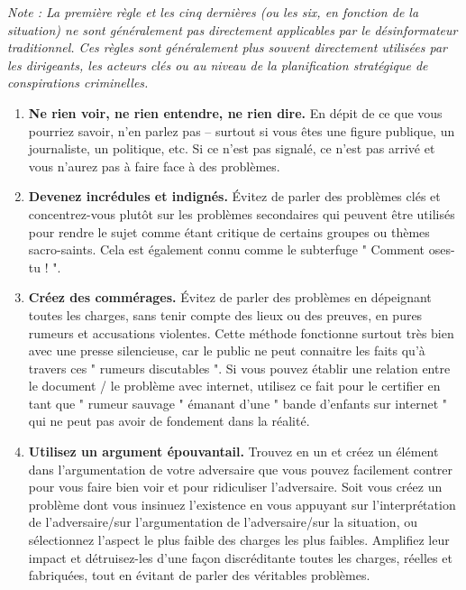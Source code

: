 \documentclass[11pt,twoside,a4paper]{article}
\begin{document}
\emph{Note : La premi{\`e}re r{\`e}gle et les cinq derni{\`e}res (ou les six, en fonction de la situation) ne sont g{\'e}n{\'e}ralement pas directement applicables par le d{\'e}sinformateur traditionnel. Ces r{\`e}gles sont g{\'e}n{\'e}ralement plus souvent directement utilis{\'e}es par les dirigeants, les acteurs cl{\'e}s ou au niveau de la planification strat{\'e}gique de conspirations criminelles.}~\\
\setlength\parindent{20pt}
\begin{enumerate}
	\item \textbf{Ne rien voir, ne rien entendre, ne rien dire. } En d{\'e}pit de ce que vous pourriez savoir, n'en parlez pas -- surtout si vous {\^e}tes une figure publique, un journaliste, un politique, etc. Si ce n'est pas signal{\'e}, ce n'est pas arriv{\'e} et vous n'aurez pas {\`a} faire face {\`a} des probl{\`e}mes.
	\item \textbf{Devenez incr{\'e}dules et indign{\'e}s. } {\'E}vitez de parler des probl{\`e}mes cl{\'e}s et concentrez-vous plut{\^o}t sur les probl{\`e}mes secondaires qui peuvent {\^e}tre utilis{\'e}s pour rendre le sujet comme {\'e}tant critique de certains groupes ou th{\`e}mes sacro-saints. Cela est {\'e}galement connu comme le subterfuge " Comment oses-tu ! ".
	\item \textbf{Cr{\'e}ez des comm{\'e}rages. } {\'E}vitez de parler des probl{\`e}mes en d{\'e}peignant toutes les charges, sans tenir compte des lieux ou des preuves, en pures rumeurs et accusations violentes. Cette m{\'e}thode fonctionne surtout tr{\`e}s bien avec une presse silencieuse, car le public ne peut connaitre les faits qu'{\`a} travers ces " rumeurs discutables ". Si vous pouvez {\'e}tablir une relation entre le document / le probl{\`e}me avec internet, utilisez ce fait pour le certifier en tant que " rumeur sauvage " {\'e}manant d'une " bande d'enfants sur internet " qui ne peut pas avoir de fondement dans la r{\'e}alit{\'e}.
	\item \textbf{Utilisez un argument {\'e}pouvantail. } Trouvez en un et cr{\'e}ez un {\'e}l{\'e}ment dans l'argumentation de votre adversaire que vous pouvez facilement contrer pour vous faire bien voir et pour ridiculiser l'adversaire. Soit vous cr{\'e}ez un probl{\`e}me dont vous insinuez l'existence en vous appuyant sur l'interpr{\'e}tation de l'adversaire/sur l'argumentation de l'adversaire/sur la situation, ou s{\'e}lectionnez l'aspect le plus faible des charges les plus faibles. Amplifiez leur impact et d{\'e}truisez-les d'une fa\c{c}on discr{\'e}ditante toutes les charges, r{\'e}elles et fabriqu{\'e}es, tout en {\'e}vitant de parler des v{\'e}ritables probl{\`e}mes.

\end{enumerate}
\end{document}
